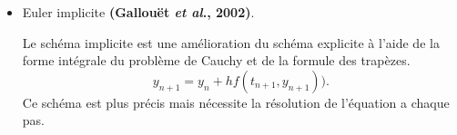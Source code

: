\documentclass[12pt, oneside]{report} %
\theoremstyle{definition}
\newtheorem{exam}{\textbf{Exemple}}[section]
\theoremstyle{remark}
\begin{document}
\begin{enumerate}
\begin{itemize}
			\item {Euler implicite} \textbf{(Gallouët \textit{et al}., 2002)}.
			
			Le schéma implicite est une amélioration du schéma explicite à l'aide de la forme intégrale du problème de Cauchy
			et de la formule des trapèzes. 
			\begin{equation}
				\label{f:eulerimplicite}
				y_{n+1} = y_n + hf(t_{n+1}, y_{n+1})).
			\end{equation}
			Ce schéma est plus précis mais nécessite la résolution de l'équation a chaque pas.
			
		\end{itemize}
		

\end{enumerate}
\end{document}
